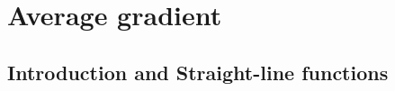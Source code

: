          \chapter{Average gradient}
    \setcounter{figure}{1}
    \setcounter{subfigure}{1}
    \label{3b3f311aa3ebba82678f2a2244617492}
         \section{ Introduction and Straight-line functions}
    \nopagebreak
    \label{m39213*cid2}
